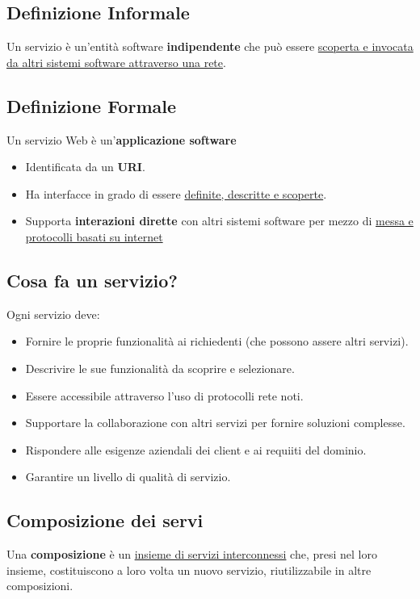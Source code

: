 \subsection{Definizione Informale}
Un servizio è un'entità software \textbf{indipendente} che può essere \uline{scoperta e invocata da altri sistemi software attraverso una rete}.

\subsection{Definizione Formale}
Un servizio Web è un'\textbf{applicazione software}
\begin{itemize}
    \item Identificata da un \textbf{URI}.
    \item Ha interfacce in grado di essere \uline{definite, descritte e scoperte}.
    \item Supporta \textbf{interazioni dirette} con altri sistemi software per mezzo di \uline{messa e protocolli basati su internet}
\end{itemize}

\subsection{Cosa fa un servizio?}
Ogni servizio deve:
\begin{itemize}
    \item Fornire le proprie funzionalità ai richiedenti (che possono assere altri servizi).
    \item Descrivire le sue funzionalità da scoprire e selezionare.
    \item Essere accessibile attraverso l'uso di protocolli rete noti.
    \item Supportare la collaborazione con altri servizi per fornire soluzioni complesse.
    \item Rispondere alle esigenze aziendali dei client e ai requiiti del dominio.
    \item Garantire un livello di qualità di servizio.
\end{itemize}

\subsection{Composizione dei servi}
Una \textbf{composizione} è un \uline{insieme di servizi interconnessi} che, presi nel loro insieme, costituiscono a loro volta un nuovo servizio, riutilizzabile in altre composizioni.

